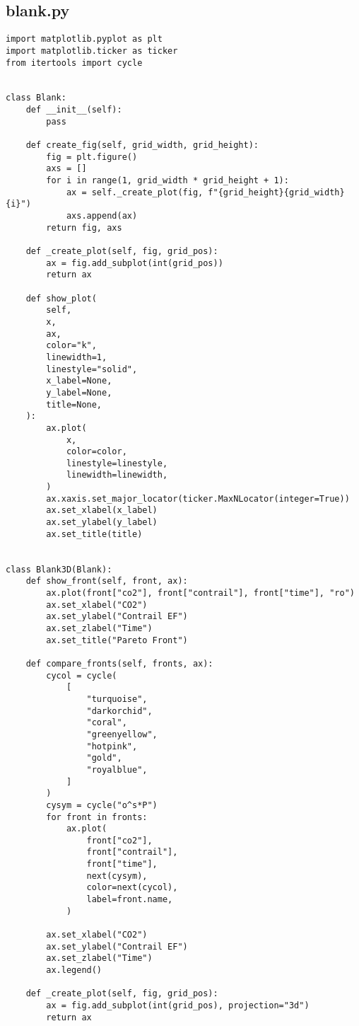 \subsection{blank.py}
\begin{verbatim}
import matplotlib.pyplot as plt
import matplotlib.ticker as ticker
from itertools import cycle


class Blank:
    def __init__(self):
        pass

    def create_fig(self, grid_width, grid_height):
        fig = plt.figure()
        axs = []
        for i in range(1, grid_width * grid_height + 1):
            ax = self._create_plot(fig, f"{grid_height}{grid_width}{i}")
            axs.append(ax)
        return fig, axs

    def _create_plot(self, fig, grid_pos):
        ax = fig.add_subplot(int(grid_pos))
        return ax

    def show_plot(
        self,
        x,
        ax,
        color="k",
        linewidth=1,
        linestyle="solid",
        x_label=None,
        y_label=None,
        title=None,
    ):
        ax.plot(
            x,
            color=color,
            linestyle=linestyle,
            linewidth=linewidth,
        )
        ax.xaxis.set_major_locator(ticker.MaxNLocator(integer=True))
        ax.set_xlabel(x_label)
        ax.set_ylabel(y_label)
        ax.set_title(title)


class Blank3D(Blank):
    def show_front(self, front, ax):
        ax.plot(front["co2"], front["contrail"], front["time"], "ro")
        ax.set_xlabel("CO2")
        ax.set_ylabel("Contrail EF")
        ax.set_zlabel("Time")
        ax.set_title("Pareto Front")

    def compare_fronts(self, fronts, ax):
        cycol = cycle(
            [
                "turquoise",
                "darkorchid",
                "coral",
                "greenyellow",
                "hotpink",
                "gold",
                "royalblue",
            ]
        )
        cysym = cycle("o^s*P")
        for front in fronts:
            ax.plot(
                front["co2"],
                front["contrail"],
                front["time"],
                next(cysym),
                color=next(cycol),
                label=front.name,
            )

        ax.set_xlabel("CO2")
        ax.set_ylabel("Contrail EF")
        ax.set_zlabel("Time")
        ax.legend()

    def _create_plot(self, fig, grid_pos):
        ax = fig.add_subplot(int(grid_pos), projection="3d")
        return ax

\end{verbatim}

